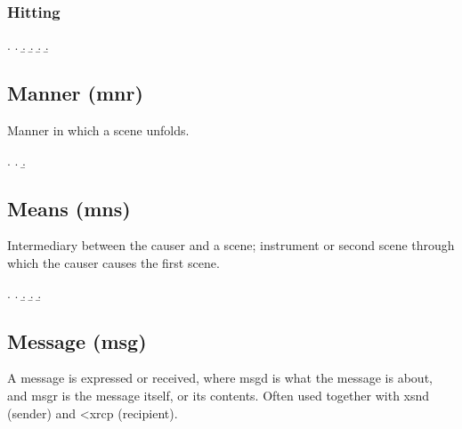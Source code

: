 \documentclass[a4paper]{article}
\begin{document}
\subsubsection{Hitting}

\ex.
\a. 
\b. 
\b. 
\b. 
\b. 


\clearpage
\subsection{Manner (\textsf{mnr})}
\label{sec:mnr}

Manner in which a scene unfolds.

\ex.
\a. 
\b. 


\clearpage
\subsection{Means (\textsf{mns})}
\label{sec:mns}

Intermediary between the causer and a scene; instrument or second scene through
which the causer causes the first scene.

\ex.
\a. 
\b. 
\b. 
\b. 


\clearpage
\subsection{Message (\textsf{msg})}
\label{sec:msg}

A message is expressed or received, where \textsf{msgd} is what the message is
about, and \textsf{msgr} is the message itself, or its contents. Often used
together with \textsf{xsnd} (sender) and \textsf{<xrcp} (recipient).
\end{document}
